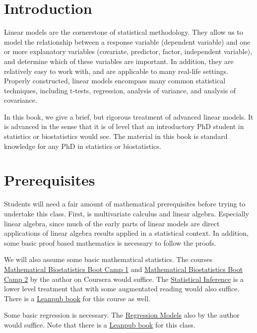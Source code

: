 \section{Introduction}

Linear models are the cornerstone of statistical methodology. They allow us to model the relationship between a response variable (dependent variable) and one or more explanatory variables (covariate, predictor, factor, independent variable), and determine which of these variables are important. In addition, they are relatively easy to work with, and are applicable to many real-life settings.  Properly constructed, linear models encompass many common statistical techniques, including t-tests, regression, analysis of variance, and analysis of covariance.

In this book, we give a brief, but rigorous 
treatment of advanced linear models.
It is advanced in the sense that it is of level that an
introductory PhD student in statistics or biostatistics
would see. The material in this book is standard
knowledge for any PhD in statistics or biostatistics. 

\section{Prerequisites}

Students will need a fair amount of mathematical prerequisites
before trying to undertake this class. First, is multivariate
calculus and linear algebra. Especially linear algebra, since
much of the early parts of linear models are direct applications
of linear algebra results applied in a statistical context.
In addition, some basic proof based mathematics is necessary
to follow the proofs.

We will also assume some basic mathematical statistics. The
courses \href{https://www.coursera.org/course/biostats}{Mathematical Biostatistics Boot Camp 1}
and \href{https://www.coursera.org/course/biostats2}{Mathematical Biostatistics Boot Camp 2}
by the author on Coursera would suffice. The \href{https://www.coursera.org/course/statinference}{Statistical Inference} is a lower level
treatment that with some augmentated reading would also suffice.
There is a \href{https://leanpub.com/LittleInferenceBook}{Leanpub book} for
this course as well.

Some basic regression is necessary. The \href{https://www.coursera.org/course/regmods}{Regression Models}
also by the author would suffice. Note that there is a
\href{https://leanpub.com/regmods/}{Leanpub book} for this class. 

